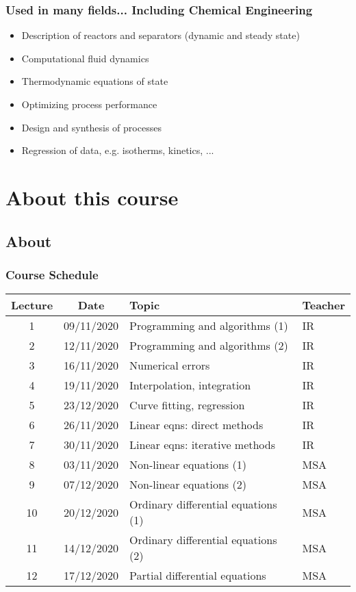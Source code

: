 \begin{frame}
 \frametitle{Used in many fields... Including Chemical Engineering}
  \begin{itemize}
	  \item Description of reactors and separators (dynamic and steady state)
		\item Computational fluid dynamics
		\item Thermodynamic equations of state
		\item Optimizing process performance
		\item Design and synthesis of processes
		\item Regression of data, e.g. isotherms, kinetics, ...
 \end{itemize}
\end{frame}

\section{About this course}
\subsection{About}
\begin{frame}
 \frametitle{Course Schedule}
 \centering
 \begin{tabular}{ccll}
 \hline
 Lecture & Date & Topic & Teacher \\ 
 \hline
 1  & 09/11/2020 & Programming and algorithms (1)       & IR \\ 
 2  & 12/11/2020 & Programming and algorithms (2)       & IR \\ 
 3  & 16/11/2020 & Numerical errors                     & IR \\ 
 4  & 19/11/2020 & Interpolation, integration           & IR \\ 
 5  & 23/12/2020 & Curve fitting, regression            & IR \\ 
 6  & 26/11/2020 & Linear eqns: direct methods          & IR\\ 
 7  & 30/11/2020 & Linear eqns: iterative methods       & IR \\ 
 8  & 03/11/2020 & Non-linear equations (1)             & MSA \\ 
 9  & 07/12/2020 & Non-linear equations (2)             & MSA\\ 
 10 & 20/12/2020 & Ordinary differential equations (1)  & MSA \\
 11 & 14/12/2020 & Ordinary differential equations (2)  & MSA \\ 
 12 & 17/12/2020 & Partial differential equations       & MSA \\ 
 \hline
 \end{tabular} 
\end{frame}

